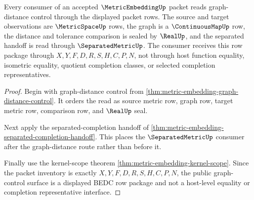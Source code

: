 \begin{theorem}
\label{thm:metric-embedding-public-graph-control-surface}
Every consumer of an accepted $\MetricEmbeddingUp$ packet reads graph-distance control through the displayed packet rows. The source and target observations are $\MetricSpaceUp$ rows, the graph is a $\ContinuousMapUp$ row, the distance and tolerance comparison is sealed by $\RealUp$, and the separated handoff is read through $\SeparatedMetricUp$. The consumer receives this row package through $X,Y,F,D,R,S,H,C,P,N$, not through host function equality, isometric equality, quotient completion classes, or selected completion representatives.
\end{theorem}
\begin{proof}
Begin with graph-distance control from \autoref{thm:metric-embedding-graph-distance-control}. It orders the read as source metric row, graph row, target metric row, comparison row, and $\RealUp$ seal.

Next apply the separated-completion handoff of \autoref{thm:metric-embedding-separated-completion-handoff}. This places the $\SeparatedMetricUp$ consumer after the graph-distance route rather than before it.

Finally use the kernel-scope theorem \autoref{thm:metric-embedding-kernel-scope}. Since the packet inventory is exactly $X,Y,F,D,R,S,H,C,P,N$, the public graph-control surface is a displayed BEDC row package and not a host-level equality or completion representative interface.
\end{proof}

